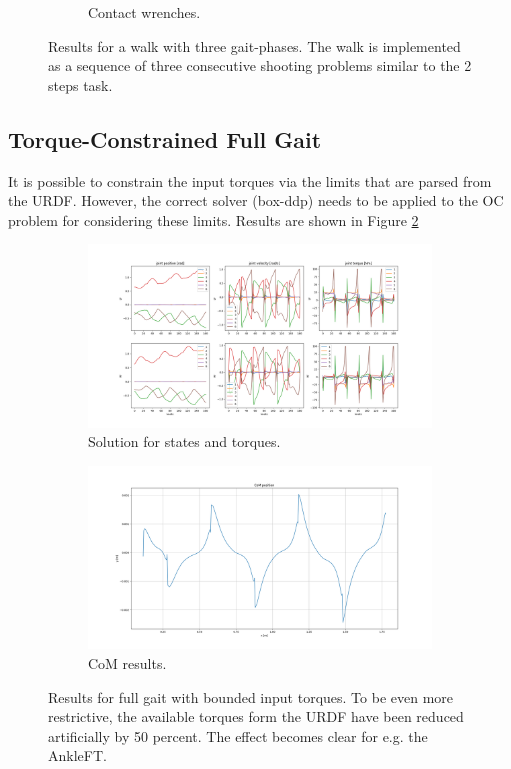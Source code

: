 \begin{figure}[h!]
\begin{subfigure}{.7\textwidth}
\caption{Contact wrenches.}
\end{subfigure}
\caption{Results for a walk with three gait-phases. The walk is implemented as a sequence of three  consecutive shooting problems similar to the 2 steps task.}
\label{fig:rh5_full_gait}
\centering
\end{figure}

\subsection{Torque-Constrained Full Gait}
It is possible to constrain the input torques via the limits that are parsed from the URDF. However, the correct solver (box-ddp) needs to be applied to the OC problem for considering these limits.  Results are shown in Figure \ref{fig:rh5_constrain_torque}
\begin{figure}[h!]
\centering
\begin{subfigure}{1\textwidth}
  \centering
  \includegraphics[width=1\linewidth]{Media/Crocoddyl/RH5Legs/BoundedInput/RH5GaitUbound50Percent_Solution.png}
  \caption{Solution for states and torques.}
\end{subfigure}
\begin{subfigure}{1\textwidth}
  \centering
\includegraphics[width=1\linewidth]{Media/Crocoddyl/RH5Legs/BoundedInput/RH5GaitUbound50Percent_CoM.png}
\caption{CoM results.}
\end{subfigure}
\caption{Results for full gait with bounded input torques. To be even more restrictive, the available torques form the URDF have been reduced artificially by 50 percent. The effect becomes clear for e.g. the AnkleFT.}
\label{fig:rh5_constrain_torque}
\centering
\end{figure}

